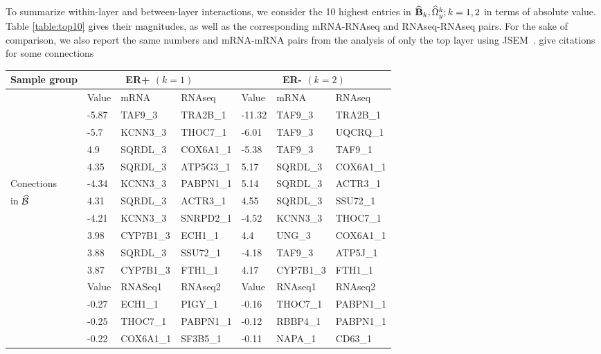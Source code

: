 To summarize within-layer and between-layer interactions, we consider the 10 highest entries in $\widehat {{\mathbf{B}}}_k, \widehat \Omega_y^k; k = 1,2$ in terms of absolute value. Table \ref{table:top10} gives their magnitudes, as well as the corresponding mRNA-RNAseq and RNAseq-RNAseq pairs. For the sake of comparison, we also report the same numbers and mRNA-mRNA pairs from the analysis of only the top layer using JSEM~\citep{MaMichailidis15}. {\colrbf give citations for some connections}

\begin{table}[t!]
\centering
    \begin{tabular}{l|lll|lll}
    \hline
Sample group & \multicolumn{3}{c}{ER+ $(k=1)$} & \multicolumn{3}{c}{ER- $(k=2)$} \\\hline
    ~ & Value & mRNA      &  RNAseq   & Value  & mRNA      &  RNAseq   \\\cline{2-7}
    ~ & -5.87 & TAF9\_3   & TRA2B\_1  & -11.32 & TAF9\_3   & TRA2B\_1  \\
    ~ & -5.7  & KCNN3\_3  & THOC7\_1  & -6.01  & TAF9\_3   & UQCRQ\_1  \\
    ~ & 4.9   & SQRDL\_3  & COX6A1\_1 & -5.38  & TAF9\_3   & TAF9\_1   \\
    ~ & 4.35  & SQRDL\_3  & ATP5G3\_1 & 5.17   & SQRDL\_3  & COX6A1\_1 \\
Conections & -4.34 & KCNN3\_3  & PABPN1\_1 & 5.14   & SQRDL\_3  & ACTR3\_1  \\
in $\widehat {{\cal{B}}}$ & 4.31  & SQRDL\_3  & ACTR3\_1  & 4.55   & SQRDL\_3  & SSU72\_1  \\
    ~ & -4.21 & KCNN3\_3  & SNRPD2\_1 & -4.52  & KCNN3\_3  & THOC7\_1  \\
    ~ & 3.98  & CYP7B1\_3 & ECH1\_1   & 4.4    & UNG\_3    & COX6A1\_1 \\
    ~ & 3.88  & SQRDL\_3  & SSU72\_1  & -4.18  & TAF9\_3   & ATP5J\_1  \\
    ~ & 3.87  & CYP7B1\_3 & FTH1\_1   & 4.17   & CYP7B1\_3 & FTH1\_1   \\ \hline
    \hline
    ~ & Value &    RNASeq1 &  RNAseq2  & Value &  RNAseq1 &  RNAseq2     \\\cline{2-7}
    ~ & -0.27 & ECH1\_1    & PIGY\_1   & -0.16 & THOC7\_1 & PABPN1\_1    \\
    ~ & -0.25 & THOC7\_1   & PABPN1\_1 & -0.12 & RBBP4\_1 & PABPN1\_1    \\
    ~ & -0.22 & COX6A1\_1  & SF3B5\_1  & -0.11 & NAPA\_1  & CD63\_1      \\

\end{tabular}
\end{table}
